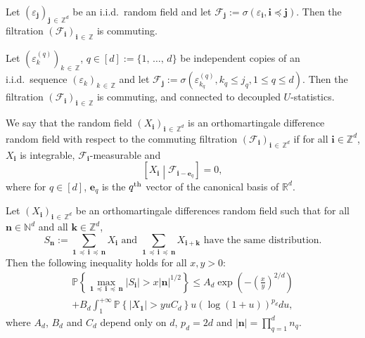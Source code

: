 \documentclass[AHL,Unicode,longabstracts,published]{cedram}
\newcommand{\f}{\mathcal{F}}
\newcommand\R{\mathbb{R}}
\newcommand\N{\mathbb{N}}
\newcommand\PP{\mathbb{P}}
\newcommand\Z{\mathbb{Z}}
\newcommand\ens[1]{\{ #1\}}
\newcommand\abs[1]{|#1|}
\newcommand{\pr}[1]{(#1)}
\newcommand\eps{\varepsilon}
\newcommand{\gr}[1]{\bm{#1}}
\newcommand{\gri}{\bm{i}}
\newcommand{\grj}{\bm{j}}
\newcommand{\grn}{\bm{n}}
\newcommand{\grk}{\bm{k}}
\newcommand{\imd}{\preccurlyeq}
\begin{document}
\begin{exam}
Let $\pr{\eps_{\grj}}_{\grj\,\in\,\Z^d}$ be an i.i.d.\ random field and let $\f_{\grj}:=\sigma\pr{\eps_{\gri},\gri\imd\grj}$. Then the filtration $\pr{\f_{\gri}}_{\gri\,\in\,\Z}$ is commuting.
\end{exam}

\begin{exam}
Let $\pr{\eps_k^{\pr{q}}}_{k\,\in\,\Z}$, $q\in [d]:=\ens{1,\,\dots,\,d}$ be independent copies of an i.i.d.\ sequence $\pr{\eps_k}_{k\,\in\,\Z}$ and let $\f_{\grj}:=\sigma\pr{\eps_{k_q}^{\pr{q}},k_q\leq j_q,1\leq q\leq d}$. Then the filtration $\pr{\f_{\gri}}_{\gri\,\in\,\Z}$ is commuting, and connected to decoupled $U$-statistics.
\end{exam}


\begin{defi}
We say that the random field $\pr{X_{\gri}}_{\gri\,\in\,\Z^d}$ is an orthomartingale difference random field with respect to the commuting filtration $\pr{\f_{\gri}}_{\gri\,\in\,\Z^d}$ if for all $\gri\in\Z^d$, $X_{\gri}$ is integrable, $\f_{\gri}$-measurable and
\begin{equation}
\left[X_{\gri}\middle| \f_{\gri-\gr{e}_q}\right]=0,
\end{equation}
where for $q\in [d]$, $\gr{e}_q$ is the $q^{\rm th}$ vector of the canonical basis of $\R^d$.
\end{defi}


\begin{theo}\label{thm:deviation_inequality_orthomartingale}
Let $\pr{X_{\gri}}_{\gri\,\in\,\Z^d}$ be an orthomartingale differences random field such that for all $\grn\in\N^d$ and all $\grk\in\Z^d$,
\begin{equation}\label{eq:invariance_loi_sommes}
S_{\grn}:=\sum_{\gr{1}\,\imd\,\gri\,\imd\,\grn} X_{\gri}\text{ and } \sum_{\gr{1}\,\imd\,\gri\,\imd\,\grn} X_{\gri+\grk}\text{ have the same distribution}.
\end{equation}
Then the following inequality holds for all $x,y>0$:
\begin{multline}\label{eq:exp_deviation_inequality_orthomartingale}
\PP\left\{\max_{\gr{1}\,\imd\,\gri\,\imd\,\gr{n}} \left|S_{\gri} \right| >x\left|\grn\right|^{1/2}\right\}\leq A_d\exp\left(-\left(\frac{x}{y}\right)^{2/d}\right)
\\+B_d\int_1^{+\infty}\PP\left\{\left|X_{\gr{1}}\right|>yuC_d\right\} u\left(\log\pr{1+u}\right)^{p_d}du,
\end{multline}
where $A_d$, $B_d$ and $C_d$ depend only on $d$, $p_d=2d$ and $\abs{\grn}=\prod_{q=1}^dn_q$.
\end{theo}
\end{document}
